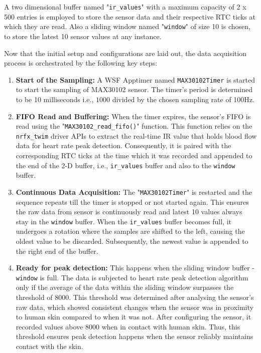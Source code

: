 \noindent A two dimensional buffer named "\texttt{ir\_values}" with a maximum capacity of 2 x 500 entries is employed to store the sensor data and their respective RTC ticks at which they are read. Also a sliding window named "\texttt{window}" of size 10 is chosen, to store the latest 10 sensor values at any instance.
\vspace{2\baselineskip}

\noindent Now that the initial setup and configurations are laid out, the data acquisition process is orchestrated by the following key steps:

\begin{enumerate}
    \item \textbf{Start of the Sampling:} A WSF Apptimer named \texttt{MAX30102Timer} is started to start the sampling of MAX30102 sensor. The timer's period is determined to be 10 milliseconds i.e., \(1000\) divided by the chosen sampling rate of 100Hz. 

    \item \textbf{FIFO Read and Buffering:} When the timer expires, the sensor's FIFO is read using the "\texttt{MAX30102\_read\_fifo()}" function. This function relies on the \texttt{nrfx\_twim} driver APIs to extract the real-time IR value that holds blood flow data for heart rate peak detection. Consequently, it is paired with the corresponding RTC ticks at the time which it was recorded and appended to the end of the 2-D buffer, i.e., \texttt{ir\_values} buffer and also to the \texttt{window} buffer.

    \item \textbf{Continuous Data Acquisition:} The "\texttt{MAX30102Timer}" is restarted and the sequence repeats till the timer is stopped or not started again. This ensures the raw data from sensor is continuously read and latest 10 values always stay in the \texttt{window} buffer. When the \texttt{ir\_values} buffer becomes full, it undergoes a rotation where the samples are shifted to the left, causing the oldest value to be discarded. Subsequently, the newest value is appended to the right end of the buffer. 
    
    \item \textbf{Ready for peak detection:} This happens when the sliding window buffer - \texttt{window} is full. The data is subjected to heart rate peak detection algorithm only if the average of the data within the sliding window surpasses the threshold of 8000. This threshold was determined after analysing the sensor's raw data, which showed consistent changes when the sensor was in proximity to human skin compared to when it was not. After configuring the sensor, it recorded values above 8000 when in contact with human skin. Thus, this threshold ensures peak detection happens when the sensor reliably maintains contact with the skin.
\end{enumerate}

